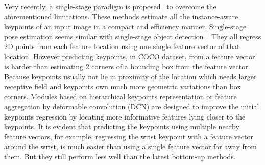 \documentclass[11pt,twocolumn,journal]{IEEEtran}
\begin{document}
Very recently, a single-stage paradigm is proposed~\cite{spm19, directpose19, pointset20} to overcome the aforementioned limitations. 
These methods estimate all the instance-aware keypoints of an input image in a compact and efficiency manner. 
Single-stage pose estimation seems similar with single-stage object detection~\cite{fcos19,reppoints19}. They all regress  2D points from each feature location using one single feature vector of that location. 
However predicting  keypoints,  in COCO \cite{coco14} dataset, from a feature vector is harder than estimating 2 corners of a bounding box from the feature vector. 
Because keypoints usually not lie in proximity of the location which needs larger receptive field and keypoints own much more geometric variations than box corners. Modules based on hierarchical keypoints representation \cite{spm19} or feature aggregation by deformable convolution (DCN) \cite{directpose19, pointset20} are designed to improve the initial keypoints regression by locating more informative features lying closer to the keypoints. 
It is evident that predicting the keypoints using multiple nearby feature vectors, for example, regressing the wrist keypoint with a feature vector around the wrist, is much easier than using a single feature vector far away from them. 
But they still perform less well than the latest bottom-up methods.
\end{document}
